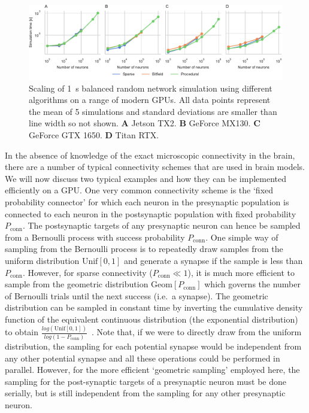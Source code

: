 \documentclass[9pt,a4paper]{amsart}
\newenvironment{fullwidth}{%
  \begin{adjustwidth}{-0.85in}{-0.85in}
}{\end{adjustwidth}}
\begin{document}
\begin{figure}
    \begin{fullwidth}
        \centering
        \includegraphics{figures/performance_scaling}
        \captionsetup{width=6.69in}
        \caption{Scaling of \SI{1}{\second} balanced random network simulation using different algorithms on a range of modern GPUs. 
        All data points represent the mean of 5 simulations and standard deviations are smaller than line width so not shown.
        \textbf{A} Jetson TX2.
        \textbf{B} GeForce MX130.
        \textbf{C} GeForce GTX 1650.
        \textbf{D} Titan RTX.}
        \label{fig:performance_scaling}
    \end{fullwidth}
\end{figure}

In the absence of knowledge of the exact microscopic connectivity in the brain, there are a number of typical connectivity schemes that are used in brain models.
We will now discuss two typical examples and how they can be implemented efficiently on a GPU.
One very common connectivity scheme is the `fixed probability connector' for which each neuron in the presynaptic population is connected to each neuron in the postsynaptic population with fixed probability $P_{\text{conn}}$.
The postsynaptic targets of any presynaptic neuron can hence be sampled from a Bernoulli process with success probability $P_{\text{conn}}$.
One simple way of sampling from the Bernoulli process is to repeatedly draw samples from the uniform distribution $\text{Unif}[0, 1]$ and generate a synapse if the sample is less than $P_{\text{conn}}$.
However, for sparse connectivity ($P_{\text{conn}} \ll 1$), it is much more efficient to sample from the geometric distribution $\text{Geom}[P_{\text{conn}}]$ which governs the number of Bernoulli trials until the next success (i.e.~a synapse).
The geometric distribution can be sampled in constant time by inverting the cumulative density function of the equivalent continuous distribution (the exponential distribution) to obtain $\frac{log(\text{Unif}[0, 1])}{log(1 - P_{\text{conn}})}$~\citep[p499]{DevroyeLuc2013}.
Note that, if we were to directly draw from the uniform distribution, the sampling for each potential synapse would be independent from any other potential synapse and all these operations could be performed in parallel.
However, for the more efficient `geometric sampling' employed here, the sampling for the post-synaptic targets of a presynaptic neuron must be done serially, but is still independent from the sampling for any other presynaptic neuron.
\end{document}
